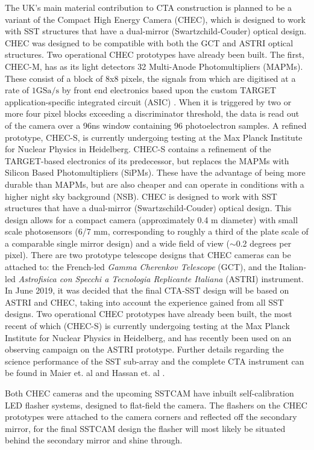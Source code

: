 The UK's main material contribution to CTA construction is planned to be a variant of the Compact High Energy Camera (CHEC), which is designed to work with SST structures that have a dual-mirror (Swartzchild-Couder) optical design. CHEC was designed to be compatible with both the GCT and ASTRI optical structures.  Two operational CHEC prototypes have already been built. The first, CHEC-M, has as its light detectors 32 Multi-Anode Photomultipliers (MAPMs)\cite{tomthesis}. These consist of a block of 8x8 pixels, the signals from which are digitised at a rate of $1\mathrm{GSa}/\mathrm{s}$ \cite{tomthesis} by front end electronics based upon the custom TARGET application-specific integrated circuit (ASIC) \cite{checmpaper}. When it is triggered by two or more four pixel blocks exceeding a discriminator threshold, the data is read out of the camera over a 96ns window containing 96 photoelectron samples. A refined prototype, CHEC-S, is currently undergoing testing at the Max Planck Institute for Nuclear Physics in Heidelberg. CHEC-S contains a refinement of the TARGET-based electronics of its predecessor, but replaces the MAPMs with Silicon Based Photomultipliers (SiPMs). These have the advantage of being more durable than MAPMs, but are also cheaper and can operate in conditions with a higher night sky background (NSB). CHEC is designed to work with SST structures that have a dual-mirror (Swartzschild-Couder) optical design. This design allows for a compact camera (approximately 0.4 m diameter) with small scale photosensors (6/7 mm, corresponding to roughly a third of the plate scale of a comparable single mirror design) and a wide field of view ($\sim$0.2 degrees per pixel). There are two prototype telescope designs that CHEC cameras can be attached to: the French-led \textit{Gamma Cherenkov Telescope} (GCT), and the Italian-led \textit{Astrofisica con Specchi a Tecnologia Replicante Italiana} (ASTRI) instrument. In June 2019, it was decided that the final CTA-SST design will be based on ASTRI and CHEC, taking into account the experience gained from all SST designs. Two operational CHEC prototypes have already been built, the most recent of which (CHEC-S) is currently undergoing testing at the Max Planck Institute for Nuclear Physics in Heidelberg, and has recently been used on an observing campaign on the ASTRI prototype. Further details regarding the science performance of the SST sub-array and the complete CTA instrument can be found in Maier et. al \cite{gernotCTA} and Hassan et. al \cite{tarekCTA}.

Both CHEC cameras and the upcoming SSTCAM have inbuilt self-calibration LED flasher systems, designed to flat-field the camera. The flashers on the CHEC prototypes were attached to the camera corners and reflected off the secondary mirror, for the final SSTCAM design the flasher will most likely be situated behind the secondary mirror and shine through. 

